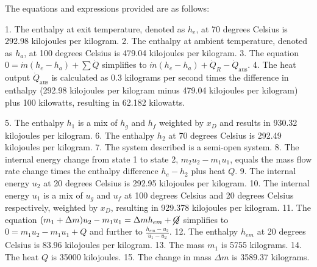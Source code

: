 The equations and expressions provided are as follows:

1. The enthalpy at exit temperature, denoted as \( h_e \), at 70 degrees Celsius is 292.98 kilojoules per kilogram.
2. The enthalpy at ambient temperature, denoted as \( h_a \), at 100 degrees Celsius is 479.04 kilojoules per kilogram.
3. The equation \( 0 = \dot{m}(h_e - h_a) + \sum \dot{Q} \) simplifies to \( \dot{m}(h_e - h_a) + \dot{Q}_R - \dot{Q}_{\text{aus}} \).
4. The heat output \( \dot{Q}_{\text{aus}} \) is calculated as 0.3 kilograms per second times the difference in enthalpy (292.98 kilojoules per kilogram minus 479.04 kilojoules per kilogram) plus 100 kilowatts, resulting in 62.182 kilowatts.

5. The enthalpy \( h_1 \) is a mix of \( h_g \) and \( h_f \) weighted by \( x_D \) and results in 930.32 kilojoules per kilogram.
6. The enthalpy \( h_2 \) at 70 degrees Celsius is 292.49 kilojoules per kilogram.
7. The system described is a semi-open system.
8. The internal energy change from state 1 to state 2, \( m_2 u_2 - m_1 u_1 \), equals the mass flow rate change times the enthalpy difference \( h_e - h_2 \) plus heat \( Q \).
9. The internal energy \( u_2 \) at 20 degrees Celsius is 292.95 kilojoules per kilogram.
10. The internal energy \( u_1 \) is a mix of \( u_g \) and \( u_f \) at 100 degrees Celsius and 20 degrees Celsius respectively, weighted by \( x_D \), resulting in 929.378 kilojoules per kilogram.
11. The equation \( (m_1 + \Delta m) u_2 - m_1 u_1 = \Delta m h_{em} + \cancel{Q} \) simplifies to \( 0 = m_1 u_2 - m_1 u_1 + Q \) and further to \( \frac{h_{em} - u_2}{u_1 - u_2} \).
12. The enthalpy \( h_{em} \) at 20 degrees Celsius is 83.96 kilojoules per kilogram.
13. The mass \( m_1 \) is 5755 kilograms.
14. The heat \( Q \) is 35000 kilojoules.
15. The change in mass \( \Delta m \) is 3589.37 kilograms.